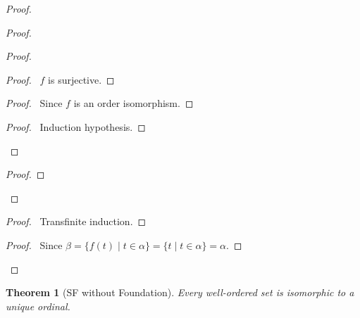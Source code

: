 \documentclass{book}
\let\qed\relax
\newtheorem{thm}[ax]{Theorem}
\theoremstyle{definition}
\begin{document}
\begin{proof}
\pf
{}
\begin{proof}
	\begin{proof}
		\begin{proof}
			\pf\ $f$ is surjective.
		\end{proof}
		\begin{proof}
			\pf\ Since $f$ is an order isomorphism.
		\end{proof}
		\begin{proof}
			\pf\ Induction hypothesis.
		\end{proof}
	\end{proof}
	\begin{proof}
	\end{proof}
\end{proof}
\begin{proof}
	\pf\ Transfinite induction.
\end{proof}
\begin{proof}
	\pf\ Since $\beta = \{ f(t) \mid t \in \alpha \} = \{ t \mid t \in \alpha \} = \alpha$.
\end{proof}
\qed
\end{proof}

\begin{thm}[SF without Foundation]
\label{thm:unique_ordinal}
Every well-ordered set is isomorphic to a unique ordinal.
\end{thm}
\end{document}
